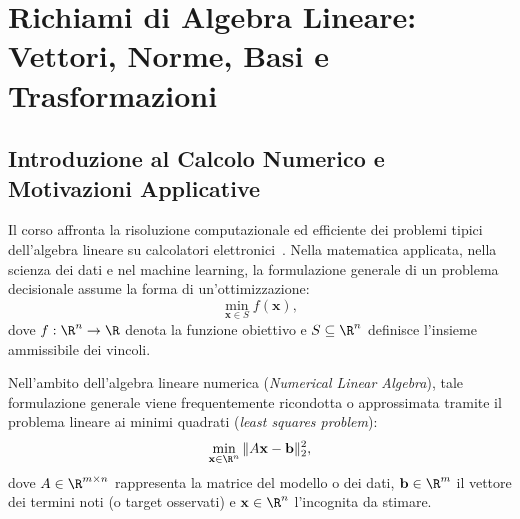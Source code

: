 \chapter{Richiami di Algebra Lineare: Vettori, Norme, Basi e Trasformazioni}
\label{chap:richiami-algebra-lineare-vettori-norme}

\FloatBarrier
\section{Introduzione al Calcolo Numerico e Motivazioni Applicative}

Il corso affronta la risoluzione computazionale ed efficiente dei problemi tipici dell'algebra lineare su calcolatori elettronici~\cite{trefethen1997numerical,golub2013matrix}. Nella matematica applicata, nella scienza dei dati e nel machine learning, la formulazione generale di un problema decisionale assume la forma di un'ottimizzazione:
\begin{equation}
    \min_{\mathbf{x} \in S} f(\mathbf{x}),
\end{equation}
dove $f: \R^n \to \R$ denota la funzione obiettivo e $S \subseteq \R^n$ definisce l'insieme ammissibile dei vincoli.

Nell'ambito dell'algebra lineare numerica (\textit{Numerical Linear Algebra}), tale formulazione generale viene frequentemente ricondotta o approssimata tramite il problema lineare ai minimi quadrati (\textit{least squares problem}):
\begin{equation}
    \min_{\mathbf{x} \in \R^n} \|A \mathbf{x} - \mathbf{b}\|_2^2,
\end{equation}
dove $A \in \R^{m \times n}$ rappresenta la matrice del modello o dei dati, $\mathbf{b} \in \R^m$ il vettore dei termini noti (o target osservati) e $\mathbf{x} \in \R^n$ l'incognita da stimare.

